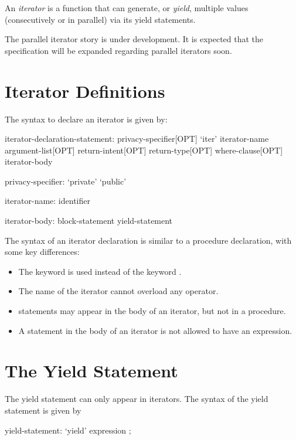 \label{Iterators}

An \emph{iterator} is a function that can generate, or \emph{yield}, multiple values (consecutively or in parallel) via its yield statements.

\begin{openissue}
The parallel iterator story is under development.  It is expected that
the specification will be expanded regarding parallel iterators soon.
\end{openissue}

\section{Iterator Definitions}
\label{Iterator_Function_Definitions}

The syntax to declare an iterator is given
by:
\begin{syntax}
iterator-declaration-statement:
  privacy-specifier[OPT] `iter' iterator-name argument-list[OPT] return-intent[OPT] return-type[OPT] where-clause[OPT]
  iterator-body

privacy-specifier:
  `private'
  `public'

iterator-name:
  identifier

iterator-body:
  block-statement
  yield-statement
\end{syntax}

The syntax of an iterator declaration is similar to a procedure declaration, with
some key differences:
\begin{itemize}
\item The keyword  is used instead of the keyword .
\item The name of the iterator cannot overload any operator.
\item {} statements may appear in the body of an iterator, but not in
a procedure.
\item A  statement in the body of an iterator is not allowed to have an expression.
\end{itemize}

\section{The Yield Statement}
\label{The_Yield_Statement}

The yield statement can only appear in iterators.  The syntax of the
yield statement is given by
\begin{syntax}
yield-statement:
  `yield' expression ;
\end{syntax}

